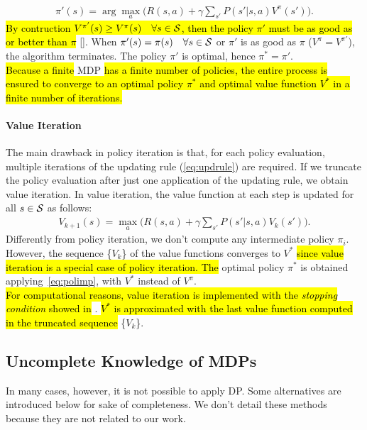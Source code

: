 \begin{align} 
\pi'(s) = \arg \max_{a} \Big( R(s,a) + \gamma \sum_{s'} P(s'|s,a)  V^{\pi}(s') \Big). \label{eq:polimp}
\end{align}
\hl{By contruction $V^{\pi'}(s) \geq V^{\pi}(s) \quad \forall s \in \mathcal{S}$, then the policy $\pi'$ must be as good as or better than $\pi$ }[\cite{sutton2018reinforcement}].
When $\pi'(s) = \pi(s) \quad \forall s \in \mathcal{S}$ or $\pi'$ is as good as $\pi$ (\ie $V^{\pi} = V^{\pi'}$), the algorithm terminates. The policy $\pi'$ is optimal, hence $\pi^{*} = \pi'$.\\
\newline
\hl{Because a finite} \ac{MDP} \hl{has a finite number of policies, the entire process is ensured to converge to an optimal policy $\pi^{*}$ and optimal value function $V^{*}$ in a finite number of iterations.}
\paragraph{Value Iteration} \label{subsec:vi}
The main drawback in policy iteration is that, for each policy evaluation, multiple iterations of the updating rule (\ref{eq:updrule}) are required. If we truncate the policy evaluation after just one application of the updating rule, we obtain value iteration. In value iteration, the value function at each step is updated for all $s \in \mathcal{S}$ as follows:
\begin{align} V_{k+1}(s) = \max_a \Big( R(s,a) + \gamma \sum_{s'}P(s'|s,a)  V_{k}(s') \Big). \end{align}
Differently from policy iteration, we don't compute any intermediate policy $\pi_i$. However, the sequence \{$V_{k}$\} of the value functions converges to $V^{*}$ \hl{since value iteration is a special case of policy iteration. The} optimal policy $\pi^{*}$ is obtained applying~\eqref{eq:polimp}, with $V^{*}$ instead of $V^{\pi}$.\\
\newline
\hl{For computational reasons, value iteration is implemented with the \emph{stopping condition} showed in} . \hl{$V^{*}$ is approximated with the last value function computed in the truncated sequence} \{$V_{k}$\}.

\subsection{Uncomplete Knowledge of \ac{MDPs}}
In many cases, however, it is not possible to apply \ac{DP}. Some alternatives are introduced below for sake of completeness. We don't detail these methods because they are not related to our work.  

